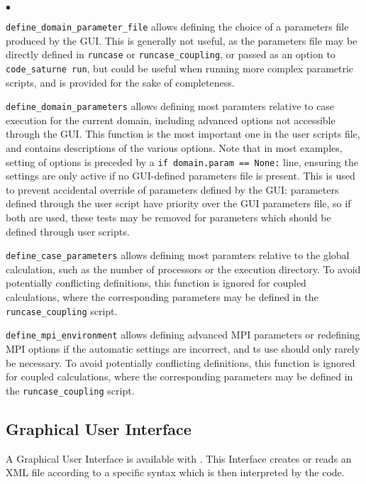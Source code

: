 {{{\begin{list}{$\bullet$}{}
\item \texttt{define\_domain\_parameter\_file} allows defining
 the choice of a parameters file produced by the GUI. This is
 generally not useful, as the parameters file may be directly
 defined in \texttt{runcase} or \texttt{runcase\_coupling}, or passed
 as an option to \texttt{code\_saturne run}, but could be useful
 when running more complex parametric scripts, and is provided for
 the sake of completeness.
\item \texttt{define\_domain\_parameters} allows defining
 most paramters relative to case execution for the current
 domain, including advanced options not accessible
 through the GUI. This function is the most important one in the user
 scripts file, and contains descriptions of the various options.
 Note that in most examples, setting of options is preceded by
 a \texttt{if domain.param == None:} line, ensuring the settings
 are only active if no GUI-defined parameters file is present.
 This is used to prevent accidental override of parameters defined
 by the GUI: parameters defined through the user script have priority
 over the GUI parameters file, so if both are used, these tests
 may be removed for parameters which should be defined through
 user scripts.
\item \texttt{define\_case\_parameters} allows defining
 most paramters relative to the global calculation, such as
 the number of processors or the execution directory.
 To avoid potentially conflicting definitions, this function is ignored
 for coupled calculations, where the corresponding parameters
 may be defined in the \texttt{runcase\_coupling} script.
\item \texttt{define\_mpi\_environment} allows defining
 advanced MPI parameters or redefining MPI options if the automatic
 settings are incorrect, and ts use should only rarely be necessary.
 To avoid potentially conflicting definitions, this function is ignored
 for coupled calculations, where the corresponding parameters
 may be defined in the \texttt{runcase\_coupling} script.
\end{list}

\subsection{Graphical User Interface}
\label{prg_gui}%
A Graphical User Interface is available with \CS.
This Interface creates or reads an XML file according to
a specific \CS syntax which is then interpreted by the code.

}}}
